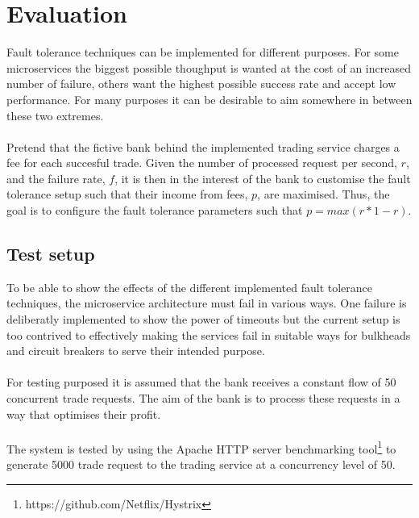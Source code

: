\section{Evaluation}
Fault tolerance techniques can be implemented for different
purposes. For some microservices the biggest possible thoughput is
wanted at the cost of an increased number of failure, others want
the highest possible success rate and accept low performance. For many
purposes it can be desirable to aim somewhere in between these two
extremes.
\\\\
Pretend that the fictive bank behind the implemented trading service
charges a fee for each succesful trade. Given the number of processed
request per second, $r$, and the failure rate, $f$, it is then in the
interest of the bank to customise the fault tolerance setup such that
their income from fees, $p$, are maximised. Thus, the goal is to
configure the fault tolerance parameters such that $p = max(r *
1-r)$.

\subsection{Test setup}
To be able to show the effects of the different implemented fault
tolerance techniques, the microservice architecture must fail in
various ways. One failure is deliberatly implemented to show the power
of timeouts but the current setup is too contrived to effectively
making the services fail in suitable ways for bulkheads and circuit
breakers to serve their intended purpose.
\\\\
For testing purposed it is assumed that the bank receives a
constant flow of 50 concurrent trade requests. The aim of the bank is
to process these requests in a way that optimises their profit.
\\\\
The system is tested by using the Apache HTTP server benchmarking
tool\footnote{https://github.com/Netflix/Hystrix} to generate 5000
trade request to the trading service at a concurrency level of 50.

